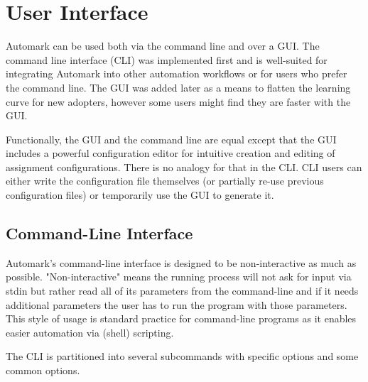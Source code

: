\documentclass[12pt,a4paper,oneside]{report}
\begin{document}
	\section{User Interface}
	Automark can be used both via the command line and over a GUI. The command line interface (CLI) was implemented first and is well-suited for integrating Automark into other automation workflows or for users who prefer the command line. The GUI was added later as a means to flatten the learning curve for new adopters, however some users might find they are faster with the GUI.

	\pagebreak
	Functionally, the GUI and the command line are equal except that the GUI includes a powerful configuration editor for intuitive creation and editing of assignment configurations. There is no analogy for that in the CLI. CLI users can either write the configuration file themselves (or partially re-use previous configuration files) or temporarily use the GUI to generate it.

	\subsection{Command-Line Interface}
	Automark's command-line interface is designed to be non-interactive as much as possible. "Non-interactive" means the running process will not ask for input via stdin but rather read all of its parameters from the command-line and if it needs additional parameters the user has to run the program with those parameters. This style of usage is standard practice for command-line programs as it enables easier automation via (shell) scripting.

	The CLI is partitioned into several subcommands with specific options and some common options.
\end{document}
